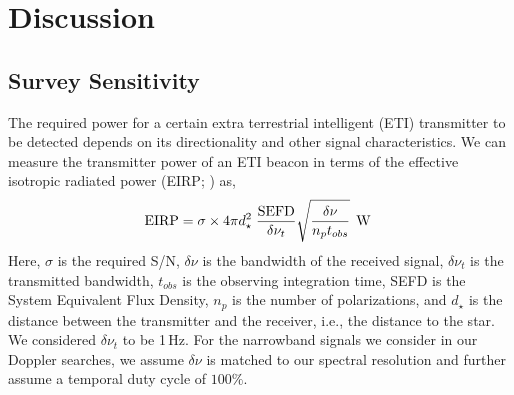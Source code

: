 \section{Discussion}\label{sec:discussion}
\subsection{Survey Sensitivity}
\label{sec:sensitivity}
The required power for a certain extra terrestrial intelligent (ETI) transmitter to be detected depends on its directionality and other signal characteristics. 
We can measure the transmitter power of an ETI beacon in terms of the effective isotropic radiated power (EIRP; \citealt{Enriquez:2017}) as,
\begin{equation}
    {\rm EIRP} = \sigma \times {4 \pi d_\star^2} \;\frac{{\rm SEFD}}{\delta{\nu_t}}\sqrt{\frac{\delta{\nu}}{n_{p}t_{obs}}}  \>\> \mathrm{W}\;
    \label{Eq:EIRP}
\end{equation}
Here, $\sigma$ is the required S/N, $\delta{\nu}$ is the bandwidth of the received signal, 
$\delta{\nu}_{t}$ is the transmitted bandwidth, $t_{obs}$ is the observing integration time, SEFD is the System Equivalent Flux Density, $n_p$ is the number of polarizations, 
and $d_\star$ is the distance between the transmitter and the receiver, i.e., the distance to the star. We considered $\delta{\nu}_{t}$ to be 1\,Hz. For the narrowband signals we consider in our Doppler searches, we assume $\delta{\nu}$ is matched to our spectral resolution and further assume a temporal duty cycle of $100\%$.


